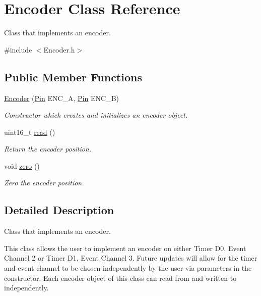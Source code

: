 \hypertarget{class_encoder}{}\section{Encoder Class Reference}
\label{class_encoder}


Class that implements an encoder.  




{\ttfamily \#include $<$Encoder.\+h$>$}

\subsection*{Public Member Functions}
\begin{DoxyCompactItemize}
\item 
\mbox{\hyperlink{class_encoder_a93f2fbbe579422d267b87cf7a6673caf}{Encoder}} (\mbox{\hyperlink{struct_pin}{Pin}} E\+N\+C\+\_\+A, \mbox{\hyperlink{struct_pin}{Pin}} E\+N\+C\+\_\+B)
\begin{DoxyCompactList}\small\item\em Constructor which creates and initializes an encoder object. \end{DoxyCompactList}\item 
uint16\+\_\+t \mbox{\hyperlink{class_encoder_a1d80d4b27aadd5198902d29b08b54b4c}{read}} ()
\begin{DoxyCompactList}\small\item\em Return the encoder position. \end{DoxyCompactList}\item 
void \mbox{\hyperlink{class_encoder_a0d3bf72860cbdc4cd62ed0019a3c8aef}{zero}} ()
\begin{DoxyCompactList}\small\item\em Zero the encoder position. \end{DoxyCompactList}\end{DoxyCompactItemize}


\subsection{Detailed Description}
Class that implements an encoder. 

This class allows the user to implement an encoder on either Timer D0, Event Channel 2 or Timer D1, Event Channel 3. Future updates will allow for the timer and event channel to be chosen independently by the user via parameters in the constructor. Each encoder object of this class can read from and written to independently. 

